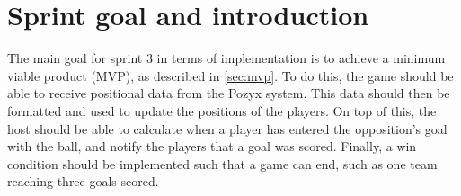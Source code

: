 \section{Sprint goal and introduction}
The main goal for sprint 3 in terms of implementation is to achieve a minimum viable product (MVP), as described in \autoref{sec:mvp}.
To do this, the game should be able to receive positional data from the Pozyx system.
This data should then be formatted and used to update the positions of the players.
On top of this, the host should be able to calculate when a player has entered the opposition's goal with the ball, and notify the players that a goal was scored.
Finally, a win condition should be implemented such that a game can end, such as one team reaching three goals scored.
